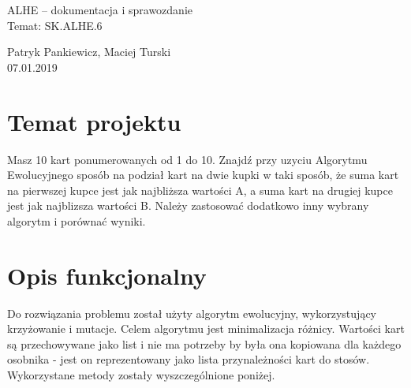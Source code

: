 \documentclass[12pt]{article}
\begin{document}
\begin{center}
\huge
ALHE -- dokumentacja i sprawozdanie\\
Temat: SK.ALHE.6 \\

\bigskip

\LARGE
Patryk Pankiewicz, Maciej Turski \\
07.01.2019 
\end{center}

\newpage

\section{Temat projektu}

Masz 10 kart ponumerowanych od 1 do 10. Znajdź przy uzyciu Algorytmu Ewolucyjnego sposób na podział kart na dwie kupki w taki sposób, że suma kart na pierwszej kupce jest jak najbliższa wartości A, a suma kart na drugiej kupce jest jak najblizsza wartości B. Należy zastosować dodatkowo inny wybrany algorytm i porównać wyniki.

\section{Opis funkcjonalny}
Do rozwiązania problemu został użyty algorytm ewolucyjny, wykorzystujący krzyżowanie i mutacje. Celem algorytmu jest minimalizacja różnicy. Wartości kart są przechowywane jako list i nie ma potrzeby by była ona kopiowana dla każdego osobnika - jest on reprezentowany jako lista przynależności kart do stosów. Wykorzystane metody zostały wyszczególnione poniżej. 
\end{document}

